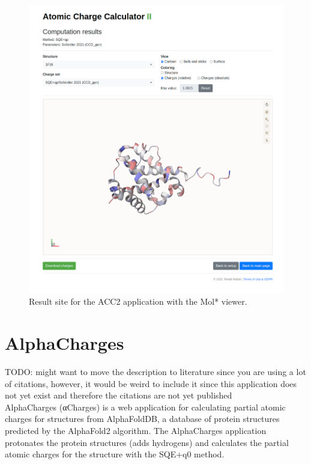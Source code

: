 \documentclass[
  digital,     %
  oneside,     %
  nosansbold,  %
  nocolorbold, %
  lof,         %
  lot,         %
]{fithesis4}
\begin{document}
\begin{figure}[htbp]
  \begin{center}
    \includegraphics[width=\textwidth]{figures/results-full.png}
  \end{center}
  \caption{Result site for the ACC2 application with the Mol* viewer.}
  \label{fig:result_site}
\end{figure}

\chapter{AlphaCharges}

TODO: might want to move the description to literature since you are using a lot of citations, however, it would be weird to include it since this application does not yet exist and therefore the citations are not yet published \\

AlphaCharges (αCharges) is a web application for calculating partial atomic charges for structures from AlphaFoldDB, a database of protein structures predicted by the AlphaFold2 algorithm. \parencite{jumper2021alphafold} The AlphaCharges application protonates the protein structures (adds hydrogens) and calculates the partial atomic charges for the structure with the SQE+q0 method. \parencite{schindler2023alphacharges, schindler2021sqe}
\end{document}
